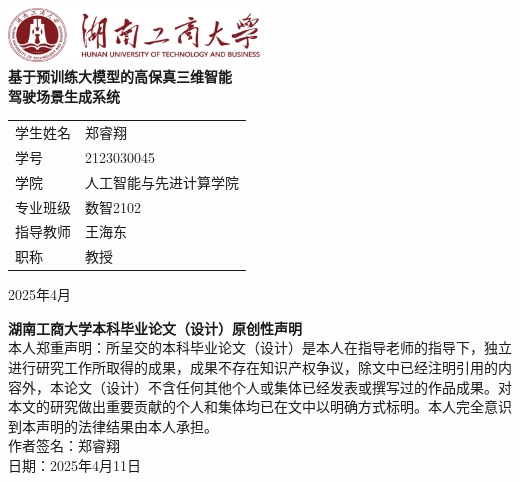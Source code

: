 \documentclass{article}
\begin{document}
\begin{titlepage}
    \centering
    \vspace*{0.5cm}  %
   \includegraphics[width=0.5\textwidth]{images/logo.png}
    \\  %
    \vspace{1.5cm} %
    \textbf{\LARGE 基于预训练大模型的高保真三维智能\\驾驶场景生成系统} \\[1.5em]
    \begin{tabular}{@{}ll@{}}
        学生姓名 & 郑睿翔 \\[1em]
        学号 & 2123030045 \\[1em]
        学院 & 人工智能与先进计算学院 \\[1em]
        专业班级 & 数智2102 \\[1em]
        指导教师 & 王海东 \\[1em]
        职称 & 教授 \\[1em]
    \end{tabular}
    \vspace{2cm} %
    \vfill  %
    \begin{center}
        2025年4月
    \end{center}
\end{titlepage}

\newpage
\begin{titlepage}
    \centering
    \vspace*{2cm}
    \textbf{\LARGE 湖南工商大学本科毕业论文（设计）原创性声明}\\[2em]
    本人郑重声明：所呈交的本科毕业论文（设计）是本人在指导老师的指导下，独立进行研究工作所取得的成果，成果不存在知识产权争议，除文中已经注明引用的内容外，本论文（设计）不含任何其他个人或集体已经发表或撰写过的作品成果。对本文的研究做出重要贡献的个人和集体均已在文中以明确方式标明。本人完全意识到本声明的法律结果由本人承担。\\[2em]
    作者签名：郑睿翔\\[1em]
    日期：2025年4月11日
\end{titlepage}
\end{document}
